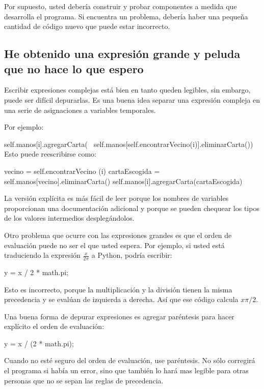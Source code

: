 Por supuesto, usted debería construir y probar componentes a medida
que desarrolla el programa. Si encuentra un problema, debería haber
una pequeña cantidad de código nuevo que puede estar incorrecto.

\subsection{He obtenido una expresión grande y peluda que no hace lo que espero}


Escribir expresiones complejas está bien en tanto queden legibles,
sin embargo, puede ser difícil depurarlas. Es una buena idea separar
una expresión compleja en una serie de asignaciones a variables temporales.

Por ejemplo:
\begin{pythoncode}
self.manos[i].agregarCarta( \
  self.manos[self.encontrarVecino(i)].eliminarCarta())
 Esto puede reescribirse como:
 
vecino = self.encontrarVecino (i)
cartaEscogida = self.manos[vecino].eliminarCarta()
self.manos[i].agregarCarta(cartaEscogida)
\end{pythoncode}
 La versión explícita es más fácil de leer porque los nombres de variables
proporcionan una documentación adicional y porque se pueden chequear
los tipos de los valores intermedios desplegándolos.

  
\index{precedencia}

Otro problema que ocurre con las expresiones grandes es que el orden
de evaluación puede no ser el que usted espera. Por ejemplo, si usted
está traduciendo la expresión $\frac{x}{2\pi}$ a Python, podría escribir:

\begin{pythoncode}
y = x / 2 * math.pi;
\end{pythoncode}
 Esto es incorrecto, porque la multiplicación y la división tienen
la misma precedencia y se evalúan de izquierda a derecha. Así que
ese código calcula $x\pi/2$.

Una buena forma de depurar expresiones es agregar paréntesis para
hacer explícito el orden de evaluación:
\begin{pythoncode}
 y = x / (2 * math.pi);
\end{pythoncode}
 Cuando no esté seguro del orden de evaluación, use paréntesis. No
sólo corregirá el programa si había un error, sino que también lo
hará mas legible para otras personas que no se sepan las reglas de
precedencia.

